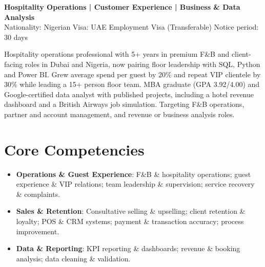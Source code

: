 \documentclass[11pt,a4paper,sans]{moderncv}
\begin{document}
\makecvtitle


\begin{center}\small\textbf{Hospitality Operations | Customer Experience | Business \& Data Analysis}\\[2pt]
Nationality: Nigerian \quad Visa: UAE Employment Visa (Transferable) \quad Notice period: 30 days\end{center}

\vspace{2pt}
\small{Hospitality operations professional with 5+ years in premium F\&B and client-facing roles in Dubai and Nigeria, now pairing floor leadership with SQL, Python and Power BI. Grew average spend per guest by 20\% and repeat VIP clientele by 30\% while leading a 15+ person floor team. MBA graduate (GPA 3.92/4.00) and Google-certified data analyst with published projects, including a hotel revenue dashboard and a British Airways job simulation. Targeting F\&B operations, partner and account management, and revenue or business analysis roles.}


\section{Core Competencies}
\vspace{1pt}
\begin{itemize}

\item \textbf{Operations \& Guest Experience}: F\&B \& hospitality operations; guest experience \& VIP relations; team leadership \& supervision; service recovery \& complaints.

\item \textbf{Sales \& Retention}: Consultative selling \& upselling; client retention \& loyalty; POS \& CRM systems; payment \& transaction accuracy; process improvement.

\item \textbf{Data \& Reporting}: KPI reporting \& dashboards; revenue \& booking analysis; data cleaning \& validation.

\end{itemize}
\end{document}
